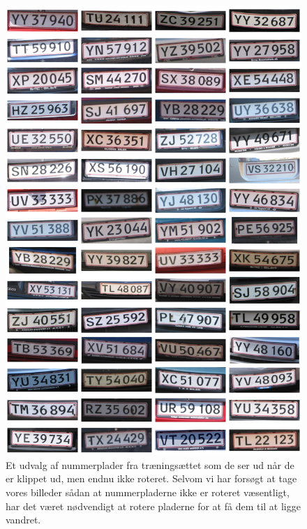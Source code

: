 \documentclass[11pt,a4paper,final]{article}
\begin{document}
\begin{figure}[htp]
\centering
\includegraphics[width=12cm]{appendix/illu/plates_not_rotated-1.jpg} 
\caption{Et udvalg af nummerplader fra træningsættet som de ser ud når de er klippet ud, men endnu ikke roteret. Selvom vi har forsøgt at tage vores billeder sådan at nummerpladerne ikke er roteret væsentligt, har det været nødvendigt at rotere pladerne for at få dem til at ligge vandret.}
\label{fig:illu:plates_not_rotated-1}
\end{figure}
\end{document}
